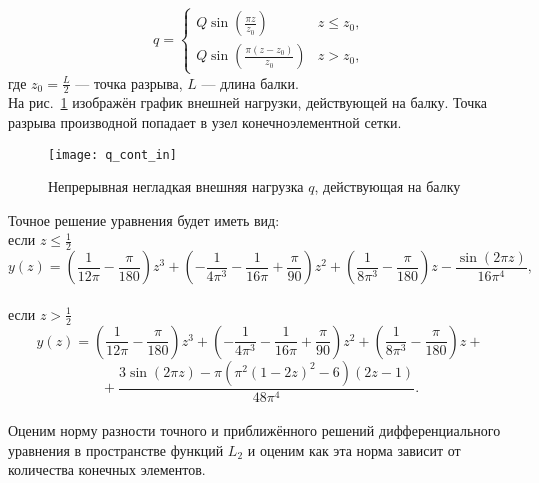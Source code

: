 \documentclass[12pt,a4paper]{article}
\begin{document}
\[
q = 
 \begin{cases}
   Q \sin \left(\frac{\pi  z}{z_{0}}\right) & z \leq z_{0}, \\
   Q \sin \left(\frac{\pi  (z-z_{0})}{z_{0}}\right) & z > z_{0},
 \end{cases}
\]
где $z_{0}=\frac{L}{2}$ --- точка разрыва, $L$ --- длина балки. \\

На рис.~\ref{fig:q_cont_in} изображён график внешней нагрузки, действующей на балку. Точка разрыва производной попадает в узел конечноэлементной сетки.
	\begin{figure}[H]
		\centering
		\texttt{[image: q\_cont\_in]}
		\caption{Непрерывная негладкая внешняя нагрузка $q$, действующая на балку}
		\label{fig:q_cont_in}
	\end{figure}

%

Точное решение уравнения будет иметь вид:\\
если $z \leq \frac{1}{2}$\\
$$y(z)= \left(\frac{1}{12 \pi }-\frac{\pi }{180}\right) z^3+\left(-\frac{1}{4 \pi ^3}-\frac{1}{16 \pi }+\frac{\pi }{90}\right) z^2+\left(\frac{1}{8 \pi ^3}-\frac{\pi }{180}\right) z -\frac{\sin (2 \pi  z)}{16 \pi ^4},$$\\
если $z > \frac{1}{2}$\\
$$y(z)= \left(\frac{1}{12 \pi }-\frac{\pi }{180}\right) z^3+\left(-\frac{1}{4 \pi ^3}-\frac{1}{16 \pi }+\frac{\pi }{90}\right) z^2+\left(\frac{1}{8 \pi ^3}-\frac{\pi }{180}\right) z +{}$$
$${} + \frac{3 \sin (2 \pi  z)-\pi  \left(\pi ^2 (1-2 z)^2-6\right) (2 z-1)}{48 \pi ^4}.$$ \\


Оценим норму разности точного и приближённого решений дифференциального уравнения в пространстве функций $L_{2}$  и оценим как эта норма зависит от количества конечных элементов.\\
\end{document}
